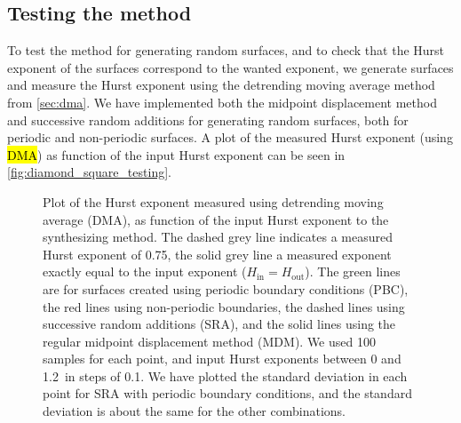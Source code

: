 \subsection{Testing the method}
To test the method for generating random surfaces, and to check that the Hurst exponent of the surfaces correspond to the wanted exponent, we generate surfaces and measure the Hurst exponent using the detrending moving average method from \cref{sec:dma}. We have implemented both the midpoint displacement method and successive random additions for generating random surfaces, both for periodic and non-periodic surfaces. A plot of the measured Hurst exponent (using \hl{DMA}) as function of the input Hurst exponent can be seen in \cref{fig:diamond_square_testing}.%
%
\begin{figure}[!htb]%
    \centering%
    {
        \newcommand{\f}{\footnotesize}%
        \newcommand{\x}{\text}%
        \newcommand{\hh}{{\f $H_\x{in}=H_\x{out}$}}%
    }
    \caption[%
        Plot of the Hurst exponent measured using detrending moving average (DMA), as function of the input Hurst exponent to the synthesizing method. The dashed grey line indicates a measured Hurst exponent of 0.75, the solid grey line a measured exponent exactly equal to the input exponent ($H_\text{in} = H_\text{out}$). The green lines are for surfaces created using periodic boundary conditions (PBC), the red lines using non-periodic boundaries, the dashed lines using successive random additions (SRA), and the solid lines using the regular midpoint displacement method (MDM). We used 100 samples for each point, and input Hurst exponents between 0 and 1.2 in steps of 0.1. We have plotted the standard deviation in each point for SRA with periodic boundary conditions, and the standard deviation is about the same for the other combinations. %
    ]{%
        Plot of the Hurst exponent measured using detrending moving average (DMA), as function of the input Hurst exponent to the synthesizing method. The dashed grey line indicates a measured Hurst exponent of 0.75, the solid grey line a measured exponent exactly equal to the input exponent ($H_\text{in} = H_\text{out}$). The green lines are for surfaces created using periodic boundary conditions (PBC), the red lines using non-periodic boundaries, the dashed lines using successive random additions (SRA), and the solid lines using the regular midpoint displacement method (MDM). We used 100 samples for each point, and input Hurst exponents between 0 and 1.2\protect\footnotemark\ in steps of 0.1. We have plotted the standard deviation in each point for SRA with periodic boundary conditions, and the standard deviation is about the same for the other combinations. %
}
\end{figure}
